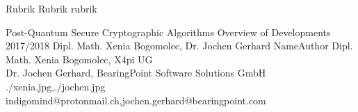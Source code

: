 \documentclass[a4paper,11pt]{article}
\begin{document}
\setcounter{footnote}{0}
\setcounter{figure}{0}


\Abschnitt
{Rubrik}
{Rubrik}
{rubrik}

\vspace{3mm}


\Aufsatz
{Post-Quantum Secure Cryptographic Algorithms}
{Overview of Developments 2017/2018}
{Dipl. Math. Xenia Bogomolec, Dr. Jochen Gerhard}
{NameAuthor}
{Dipl. Math. Xenia Bogomolec, X4pi UG\\ Dr. Jochen Gerhard, BearingPoint Software Solutions GmbH}
{./xenia.jpg,./jochen.jpg}
{indigomind@protonmail.ch,jochen.gerhard@bearingpoint.com}
\end{document}

